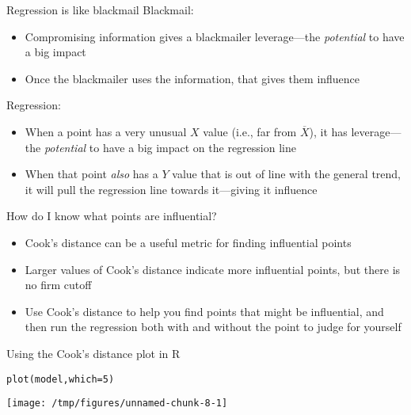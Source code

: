 \documentclass{beamer}\usepackage[]{graphicx}\usepackage[]{color}
\makeatletter
\def\maxwidth{ %
  \ifdim\Gin@nat@width>\linewidth
    \linewidth
  \else
    \Gin@nat@width
  \fi
}
\newcommand{\hlnum}[1]{\textcolor[rgb]{0.824,0.412,0.118}{#1}}%
\newcommand{\hlstd}[1]{\textcolor[rgb]{1,0.894,0.769}{#1}}%
\newcommand{\hlkwc}[1]{\textcolor[rgb]{0.78,0.941,0.545}{#1}}%
\newcommand{\hlkwd}[1]{\textcolor[rgb]{1,0.78,0.769}{#1}}%
\newenvironment{kframe}{%
 \def\at@end@of@kframe{}%
 \ifinner\ifhmode%
  \def\at@end@of@kframe{\end{minipage}}%
  \begin{minipage}{\columnwidth}%
 \fi\fi%
 \def\FrameCommand##1{\hskip\@totalleftmargin \hskip-\fboxsep
 \colorbox{shadecolor}{##1}\hskip-\fboxsep
     \hskip-\linewidth \hskip-\@totalleftmargin \hskip\columnwidth}%
 \MakeFramed {\advance\hsize-\width
   \@totalleftmargin\z@ \linewidth\hsize
   \@setminipage}}%
 {\par\unskip\endMakeFramed%
 \at@end@of@kframe}
\newenvironment{knitrout}{}{} %
\makeatother
\begin{document}
\begin{darkframes}
    \begin{frame}{Regression is like blackmail}
      Blackmail:
      \begin{itemize}
        \item Compromising information gives a blackmailer \alert{leverage}---the \emph{potential} to have a big impact
        \item Once the blackmailer uses the information, that gives them \alert{influence}
      \end{itemize}
      \pause

      Regression:
      \begin{itemize}
        \item When a point has a very unusual $X$ value (i.e., far from $\overline X$), it has \alert{leverage}---the \emph{potential} to have a big impact on the regression line
        \item When that point \emph{also} has a $Y$ value that is out of line with the general trend, it will pull the regression line towards it---giving it \alert{influence}
      \end{itemize}
    \end{frame}

    \begin{frame}{How do I know what points are influential?}
      \begin{itemize}[<+->]
        \item \alert{Cook's distance} can be a useful metric for finding influential points
        \item Larger values of Cook's distance indicate more influential points, but there is no firm cutoff
        \item Use Cook's distance to help you find points that might be influential, and then run the regression both with and without the point to judge for yourself
      \end{itemize}
    \end{frame}

    \begin{frame}{Using the Cook's distance plot in R}
\begin{knitrout}
\color{fgcolor}\begin{kframe}
\begin{alltt}
\hlkwd{plot}\hlstd{(model,} \hlkwc{which}\hlstd{=}\hlnum{5}\hlstd{)}
\end{alltt}
\end{kframe}
\texttt{[image: /tmp/figures/unnamed-chunk-8-1]} 


\end{knitrout}
\end{frame}
\end{darkframes}
\end{document}
